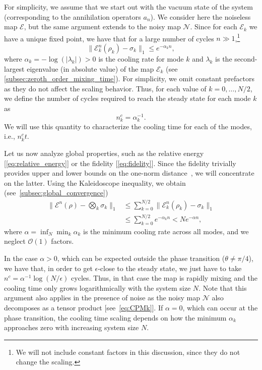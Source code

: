 \documentclass[aps,prx,twocolumn,superscriptaddress,nofootinbib,nolongbibliography,nobalancelastpage,10pt,floatfix]{revtex4-2}
\begin{document}
For simplicity, we assume that we start out with the vacuum state of the system (corresponding to the annihilation operators $a_n$). We consider here the noiseless map $\mathcal{E}$, but the same argument extends to the noisy map $\mathcal{N}$. Since for each $\mathcal{E}_k$ we have a unique fixed point, we have that for a large number of cycles $n\gg 1$,\footnote{We will not include constant factors in this discussion, since they do not change the scaling.}
\begin{equation}
    \|\mathcal{E}_k^n(\rho_k)-\sigma_k\|_1 \le e^{-\alpha_k n},
\end{equation}
where $\alpha_k=-\log(|\lambda_k|)>0$ is the cooling rate for mode $k$ and $\lambda_k$ is the second-largest eigenvalue (in absolute value) of the map $\mathcal{E}_k$ (see \cref{subsec:zeroth_order_mixing_time}). For simplicity, we omit constant prefactors as they do not affect the scaling behavior. Thus, for each value of $k=0, \ldots, N/2$, we define the number of cycles required to reach the steady state for each mode $k$ as
\begin{equation}
    n^c_k = \alpha_k^{-1}.
    \label{eq:n0k}
\end{equation}
We will use this quantity to characterize the cooling time for each of the modes, i.e., $n_k^c t$.

Let us now analyze global properties, such as the relative energy [\cref{eq:relative_energy}] or the fidelity [\cref{eq:fidelity}]. Since the fidelity trivially provides upper and lower bounds on the one-norm distance~\cite{Nielsen2012Quantum}, we will concentrate on the latter. Using the Kaleidoscope inequality, we obtain (see~\cref{subsec:global_convergence})
\begin{align}
    \|\mathcal{E}^n(\rho)-\bigotimes_k \sigma_k\|_1 &
    \leq \sum_{k=0}^{N/2} \|\mathcal{E}_k^n(\rho_k)-\sigma_k\|_1\nonumber\\
                                                    &\leq \sum_{k=0}^{N/2} e^{-\alpha_k n} < N e^{-\alpha n},
\end{align}
where $\alpha=\inf_N \min_k \alpha_k$ is the minimum cooling rate across all modes, and we neglect $\mathcal{O}(1)$ factors.

In the case $\alpha>0$, which can be expected outside the phase transition ($\theta\ne \pi/4$), we have that, in order to get $\epsilon$-close to the steady state, we just have to take $n^c= \alpha^{-1} \log(N/\epsilon)$ cycles. Thus, in that case the map is rapidly mixing and the cooling time only grows logarithmically with the system size $N$. Note that this argument also applies in the presence of noise as the noisy map $\mathcal{N}$ also decomposes as a tensor product [see~\cref{eq:CPMk}]. If $\alpha=0$, which can occur at the phase transition, the cooling time scaling depends on how the minimum $\alpha_k$ approaches zero with increasing system size $N$.
\end{document}
